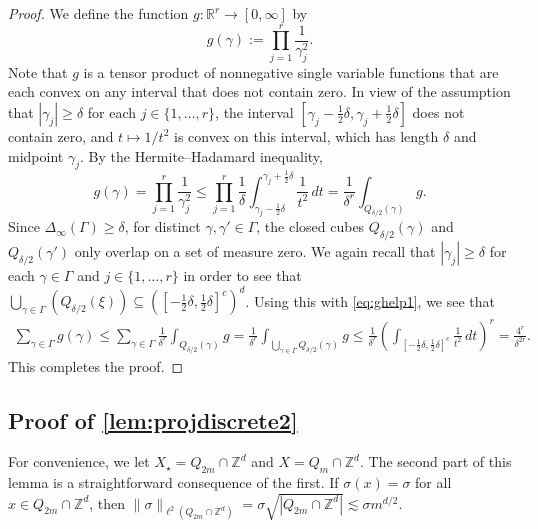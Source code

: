 \documentclass[11pt]{article}
\theoremstyle{definition}
\numberwithin{theorem}{section}
\numberwithin{lemma}{section}
\numberwithin{equation}{section}
\def\R{\mathbb{R}}
\def\Z{\mathbb{Z}}
\renewcommand{\subset}{\subseteq}
\newcommand{\sampset}{X}
\numberwithin{equation}{section}
\begin{document}
	\begin{proof}
		We define the function $g\colon \R^r\to [0,\infty]$ by
		$$
		g(\gamma):=\prod_{j=1}^r \frac{1}{\gamma_j^2}. 
		$$
		Note that $g$ is a tensor product of nonnegative single variable functions that are each convex on any interval that does not contain zero. In view of the assumption that $|\gamma_j|\geq \delta$ for each $j\in \{1,\dots,r\}$, the interval $[\gamma_j-\frac 12 \delta, \gamma_j+ \frac 12 \delta]$ does not contain zero, and $t\mapsto 1/t^2$ is convex on this interval, which has length $\delta$ and midpoint $\gamma_j$. By the Hermite–Hadamard inequality,
		\begin{equation}
			\label{eq:ghelp1}
			g(\gamma)
			= \prod_{j=1}^r \frac 1{\gamma_j^2}
			\leq \prod_{j=1}^r \frac 1 {\delta} \int_{\gamma_j-\frac 12 \delta}^{\gamma_j+\frac 12 \delta} \frac 1 {t^2}\, dt
			= \frac{1}{\delta^r} \int_{Q_{\delta/2}(\gamma)} g. 
		\end{equation}
		Since $\Delta_\infty(\Gamma)\geq \delta$, for distinct $\gamma,\gamma'\in \Gamma$, the closed cubes $Q_{\delta/2}(\gamma)$ and $Q_{\delta/2}(\gamma')$ only overlap on a set of measure zero. We again recall that $|\gamma_j|\geq \delta$ for each $\gamma\in\Gamma$ and $j\in \{1,\dots,r\}$ in order to see that $\bigcup_{\gamma\in \Gamma} (Q_{\delta/2}(\xi))\subset ([-\frac 12 \delta,\frac 12\delta]^c)^d$. Using this with \eqref{eq:ghelp1}, we see that
		\begin{align*}
			\sum_{\gamma\in \Gamma} g(\gamma)
			\leq \sum_{\gamma\in \Gamma} \frac{1}{\delta^r}  \int_{Q_{\delta/2}(\gamma)} g
			= \frac{1}{\delta^r} \int_{\bigcup_{\gamma\in \Gamma} Q_{\delta/2}(\gamma)} g
			\leq \frac{1}{\delta^r} \left( \int_{[ - \frac 12 \delta, \frac 12 \delta]^c} \frac 1 {t^2}\, dt \right)^r
			= \frac{4^r}{\delta^{2r}}. 
		\end{align*}
		This completes the proof. 
	\end{proof}
	
	\subsection{Proof of \cref{lem:projdiscrete2}}
	\label{proof:projdiscrete2}
	
		For convenience, we let $\sampset_\star = Q_{2m}\cap \Z^d$ and $\sampset= Q_{m}\cap \Z^d$. The second part of this lemma is a straightforward consequence of the first. If $\sigma(x)=\sigma$ for all $x\in Q_{2m}\cap \Z^d$, then $\|\sigma\|_{\ell^2(Q_{2m}\cap \Z^d)}=\sigma \sqrt{|Q_{2m}\cap \Z^d|}\lesssim \sigma m^{d/2}$.
		
\end{document}
